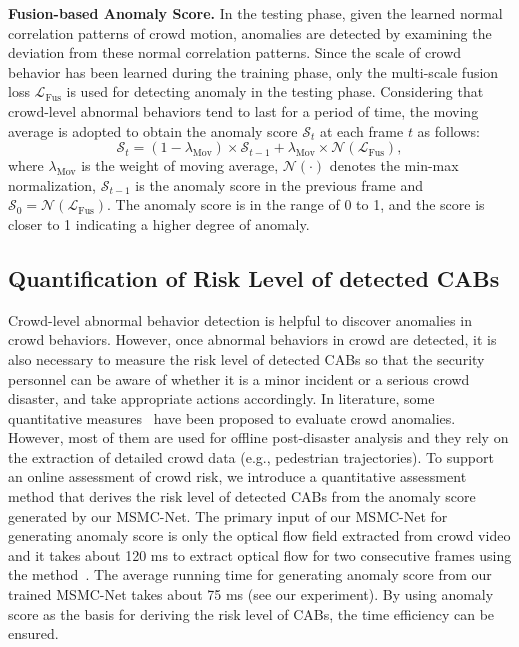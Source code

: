 \documentclass[journal]{IEEEtran}
\begin{document}
\vskip 0.03in
\noindent \textbf{Fusion-based Anomaly Score.}
In the testing phase, given the learned normal correlation patterns of crowd motion, anomalies are detected by examining the deviation from these normal correlation patterns. Since the scale of crowd behavior has been learned during the training phase, only the multi-scale fusion loss $ \mathcal{L}_{\mathrm{Fus}} $ is used for detecting anomaly in the testing phase. Considering that crowd-level abnormal behaviors tend to last for a period of time, the moving average is adopted to obtain the anomaly score $\mathcal{S}_{t}$ at each frame $t$ as follows:
\begin{equation}
\mathcal{S}_{t} = (1-\lambda_{\mathrm{Mov}}) \times \mathcal{S}_{t-1} +\lambda_{\mathrm{Mov}} \times \mathcal{N}(\mathcal{L}_{\mathrm{Fus}}),
\end{equation}
where $ \lambda_{\mathrm{Mov}} $ is the weight of moving average, $ \mathcal{N}  (\cdot ) $ denotes the min-max normalization, $ \mathcal{S}_{t-1} $ is the anomaly score in the previous frame and $\mathcal{S}_{0}\! = \!\mathcal{N}(\mathcal{L}_{\mathrm{Fus}})$. The anomaly score is in the range of 0 to 1, and the score is closer to 1 indicating a higher degree of anomaly.

\subsection{Quantification of Risk Level of detected CABs}
\label{riskQuantification}
Crowd-level abnormal behavior detection is helpful to discover anomalies in crowd behaviors. However, once abnormal behaviors in crowd are detected, it is also necessary to measure the risk level of detected CABs so that the security personnel can be aware of whether it is a minor incident or a serious crowd disaster, and take appropriate actions accordingly. In literature, some quantitative measures~\cite{zhou2013measuring, gu2014abnormal, johansson2008crowd} have been proposed to evaluate crowd anomalies. However, most of them are used for offline post-disaster analysis and they rely on the extraction of detailed crowd data (e.g., pedestrian trajectories). To support an online assessment of crowd risk, we introduce a quantitative assessment method that derives the risk level of detected CABs from the anomaly score generated by our MSMC-Net. The primary input of our MSMC-Net for generating anomaly score is only the optical flow field extracted from crowd video and it takes about 120 ms to extract optical flow for two consecutive frames using the method~\cite{bradski2000opencv}. The average running time for generating anomaly score from our trained MSMC-Net takes about 75 ms (see our experiment). By using anomaly score as the basis for deriving the risk level of CABs, the time efficiency can be ensured.
\end{document}
